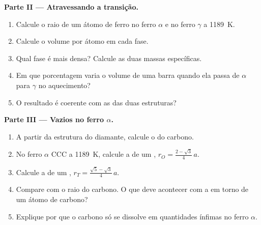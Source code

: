 \begin{problem}
\medskip
\noindent\textbf{Parte II --- Atravessando a transição.}
\begin{enumerate}[resume]
  \item Calcule o raio de um átomo de ferro no ferro $\alpha$ e no
        ferro $\gamma$ a \qty{1189}{K}.
  \item Calcule o volume por átomo em cada fase.
  \item Qual fase é mais densa? Calcule as duas massas específicas.
  \item Em que porcentagem varia o volume de uma barra quando ela passa
        de $\alpha$ para $\gamma$ no aquecimento?
  \item O resultado é coerente com as  das duas
        estruturas?
\end{enumerate}

\medskip
\noindent\textbf{Parte III --- Vazios no ferro $\alpha$.}
\begin{enumerate}[resume]
  \item A partir da estrutura do diamante, calcule o  do carbono.
  \item No ferro $\alpha$ CCC a \qty{1189}{K}, calcule a 
        de um , $r_O = \frac{2 - \sqrt3}{4}\,a$.
  \item Calcule a de um , $r_T = \frac{\sqrt5 -
        \sqrt3}{4}\,a$.
  \item Compare com o raio do carbono. O que deve acontecer com a 
        em torno de um átomo de carbono?
  \item Explique por que o carbono só se dissolve em quantidades ínfimas
        no ferro $\alpha$.
\end{enumerate}


\end{problem}

